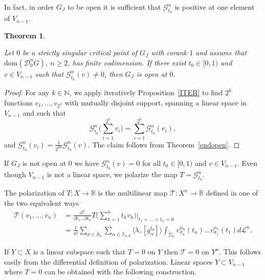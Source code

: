 \documentclass[12pt, reqno]{amsart}
\theoremstyle{plain}
\newtheorem {theorem}{Theorem}[section]
\theoremstyle{definition}
\newtheorem{definition}[theorem]{Definition}
\theoremstyle{remark}
\numberwithin{equation}{section}
\newcommand{\R}{\mathbb{R}}
\newcommand{\N}{\mathbb{N}}
\renewcommand{\L}{\mathcal{L}}
\newcommand{\I}{\mathcal{I}}
\newcommand{\T}{\mathcal{T}}
\newcommand{\s}{\sigma}
\newcommand{\0}{\theta}
\renewcommand{\a}{\alpha}
\newcommand{\1}{{-1}}
\renewcommand{\=}{\coloneqq}
\renewcommand{\.}{\dots}
\newcommand{\mc}{\mathcal}
\newcommand{\dom}{\mathrm{dom}}
\begin{document}
In fact, in order $G_J$ to be open it is sufficient that $\mc G^n _{t_0}$ is  positive at one  element of $V_{n-1}$.




\begin{theorem}
 \label{endopen2} 
  
 Let $0$ be a strictly singular critical point of $G_J$ with corank $1$ and assume that {\color{black}  $\dom(\mc D _0^n G)$,   $n\geq2$, has finite codimension.}
If  there exist $t_0\in[0,1)$ and $v\in V_{n-1}$ such that  $\mc G^n _{t_0}(v)\neq 0$, then  
   $G_J$ is open at $0$.  
   
   
   
   \end{theorem}

\begin{proof} For any $k\in \N$, we apply iteratively Proposition~\ref{ITER} to find $2^k$ functions $v_1,\dots, v_{2^k}$ with mutually disjoint support, spanning a linear space in $V_{n-1}$  and such that
\[
\mc G^n _{t_0}\Big( \sum_{i=1} ^{2^k}  v_i\Big) = \sum_{i=1} ^{2^k} 
\mc G^n _{t_0}( v_i) ,
\]
and $\mc G^n _{t_0}( v_i) =\frac{1}{2^{kn} } \mc G^n _{t_0}( v)$. The claim follows from Theorem~\ref{endopen}.
\end{proof}



If $G_J$ is not open at $0$ we have  $\mc G^n _{t_0}(v) =  0$ for all 
$t_0\in[0,1)$ and $v\in V_{n-1}$.
Even though $V_{n-1}$ is not a linear space, we polarize the map   $T= \mc G^n _{t_0}$. 


The polarization of $T: X\to \R$ is the multilinear map $\T: X^n\to\R$ defined in one of the two equivalent ways
\begin{equation}\label{PO}
\begin{split}
\T(v_1,\dots,v_n) & = \frac{\partial ^n}{\partial t_1 \dots \partial t_n} 
T\Big(\sum_{h=1}^n t_h v_h\Big)\bigg| _{t_1=\dots=t_n=0}
\\
&
=\frac{1}{n!}\sum_{\s\in S_n}\sum_{\a\in\I_{n,d} } \langle \lambda,  [g^{t_0}_{\a}]\rangle
 \int_{\Sigma_n}v^{\a_n}_{\s_n}(t_n)\.v^{\a_1}_{\s_1}(t_1)d\L^n. 
\end{split}
\end{equation}

If $Y\subset X $ is  a linear subspace such that $T=0$ on $Y$ then  $ \T=0$ on $Y^n$. 
This follows easily from the differential definition of   polarization.
Linear spaces $Y\subset V_{n-1}$ where $T=0$ can be obtained with the following construction.
\end{document}
